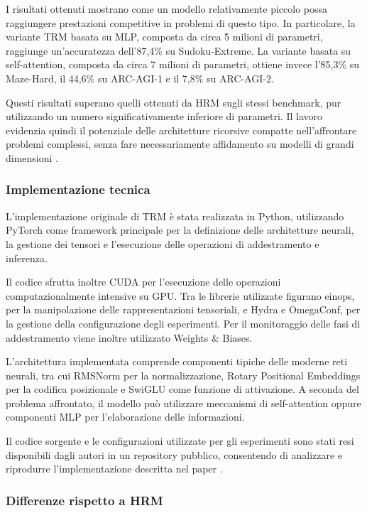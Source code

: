 I risultati ottenuti mostrano come un modello relativamente piccolo possa raggiungere prestazioni competitive in problemi di questo tipo. In particolare, la variante TRM basata su MLP, composta da circa 5 milioni di parametri, raggiunge un'accuratezza dell'87,4\% su Sudoku-Extreme. La variante basata su self-attention, composta da circa 7 milioni di parametri, ottiene invece l'85,3\% su Maze-Hard, il 44,6\% su ARC-AGI-1 e il 7,8\% su ARC-AGI-2.

Questi risultati superano quelli ottenuti da HRM sugli stessi benchmark, pur utilizzando un numero significativamente inferiore di parametri. Il lavoro evidenzia quindi il potenziale delle architetture ricorsive compatte nell'affrontare problemi complessi, senza fare necessariamente affidamento su modelli di grandi dimensioni \cite{trm}.

\subsubsection{Implementazione tecnica}

L'implementazione originale di TRM è stata realizzata in Python, utilizzando PyTorch come framework principale per la definizione delle architetture neurali, la gestione dei tensori e l'esecuzione delle operazioni di addestramento e inferenza.

Il codice sfrutta inoltre CUDA per l'esecuzione delle operazioni computazionalmente intensive su GPU. Tra le librerie utilizzate figurano einops, per la manipolazione delle rappresentazioni tensoriali, e Hydra e OmegaConf, per la gestione della configurazione degli esperimenti. Per il monitoraggio delle fasi di addestramento viene inoltre utilizzato Weights \& Biases.

L'architettura implementata comprende componenti tipiche delle moderne reti neurali, tra cui RMSNorm per la normalizzazione, Rotary Positional Embeddings per la codifica posizionale e SwiGLU come funzione di attivazione. A seconda del problema affrontato, il modello può utilizzare meccanismi di self-attention oppure componenti MLP per l'elaborazione delle informazioni.

Il codice sorgente e le configurazioni utilizzate per gli esperimenti sono stati resi disponibili dagli autori in un repository pubblico, consentendo di analizzare e riprodurre l'implementazione descritta nel paper \cite{trmcode}.

\subsubsection{Differenze rispetto a HRM}

